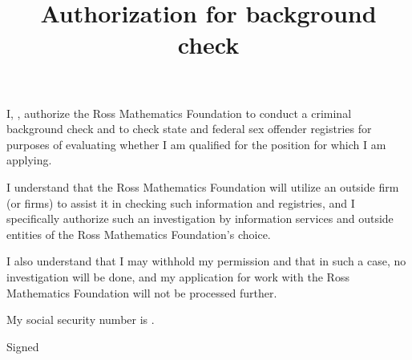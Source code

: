 \documentclass{ross}
\title{Authorization for background check}
\begin{document}
\maketitle

I, , authorize the Ross Mathematics Foundation
to conduct a criminal background check and to check state and federal
sex offender registries for purposes of evaluating whether I am
qualified for the position for which I am applying.

I understand that the Ross Mathematics Foundation will utilize an
outside firm (or firms) to assist it in checking such information and
registries, and I specifically authorize such an investigation by
information services and outside entities of the Ross Mathematics
Foundation's choice.

I also understand that I may withhold my permission and that in such a
case, no investigation will be done, and my application for work with
the Ross Mathematics Foundation will not be processed further.

My social security number is .

\vspace{0.75in}
\hfill Signed \underline{\hspace{3in}}
\quad{}
\end{document}
